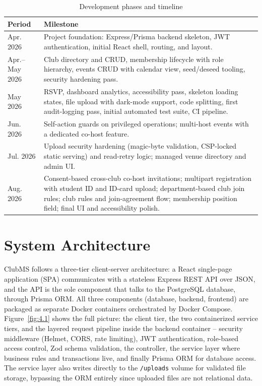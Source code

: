 \documentclass[12pt,oneside]{book}
\begin{document}
\begin{table}[H]
\caption{Development phases and timeline}
\label{tab:4.1}
\centering
\small
\begin{tabularx}{\textwidth}{@{}p{2.6cm}X@{}}
\toprule
Period & Milestone \\
\midrule
Apr. 2026 & Project foundation: Express/Prisma backend skeleton, JWT authentication, initial React shell, routing, and layout. \\
Apr.--May 2026 & Club directory and CRUD, membership lifecycle with role hierarchy, events CRUD with calendar view, seed/deseed tooling, security hardening pass. \\
May 2026 & RSVP, dashboard analytics, accessibility pass, skeleton loading states, file upload with dark-mode support, code splitting, first audit-logging pass, initial automated test suite, CI pipeline. \\
Jun. 2026 & Self-action guards on privileged operations; multi-host events with a dedicated co-host feature. \\
Jul. 2026 & Upload security hardening (magic-byte validation, CSP-locked static serving) and read-retry logic; managed venue directory and admin UI. \\
Aug. 2026 & Consent-based cross-club co-host invitations; multipart registration with student ID and ID-card upload; department-based club join rules; club rules and join-agreement flow; membership position field; final UI and accessibility polish. \\
\bottomrule
\end{tabularx}
\end{table}

\section{System Architecture}

ClubMS follows a three-tier client-server architecture: a React single-page application (SPA) communicates with a stateless Express REST API over JSON, and the API is the sole component that talks to the PostgreSQL database, through Prisma ORM. All three components (database, backend, frontend) are packaged as separate Docker containers orchestrated by Docker Compose. Figure~\ref{fig:4.1} shows the full picture: the client tier, the two containerized service tiers, and the layered request pipeline inside the backend container -- security middleware (Helmet, CORS, rate limiting), JWT authentication, role-based access control, Zod schema validation, the controller, the service layer where business rules and transactions live, and finally Prisma ORM for database access. The service layer also writes directly to the \texttt{/uploads} volume for validated file storage, bypassing the ORM entirely since uploaded files are not relational data.
\end{document}
